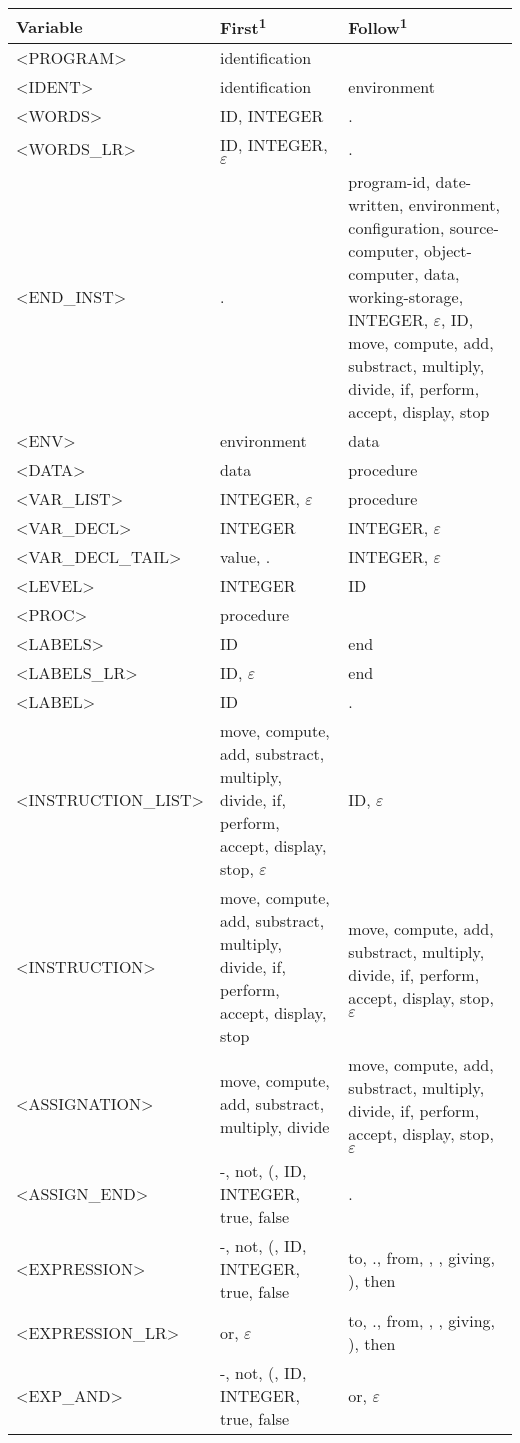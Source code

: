 \documentclass[a4paper,11pt]{article}
\begin{document}
\begin{longtable}{l>{\raggedright}p{6cm}p{6cm}}
	Variable & First\textsuperscript{1} & Follow\textsuperscript{1} \\ \hline
	<PROGRAM> & identification & \\
	<IDENT> & identification & environment\\
	<WORDS> & ID, INTEGER & .\\
	<WORDS\_LR> & ID, INTEGER, $\varepsilon$ & .\\
	<END\_INST> & . & program-id, date-written, environment, configuration, source-computer, object-computer, data, working-storage, INTEGER, $\varepsilon$, ID, move, compute, add, substract, multiply, divide, if, perform, accept, display, stop\\
	<ENV> & environment & data\\
	<DATA> & data & procedure\\
	<VAR\_LIST> & INTEGER, $\varepsilon$ & procedure \\
	<VAR\_DECL> & INTEGER & INTEGER, $\varepsilon$ \\
	<VAR\_DECL\_TAIL> & value, . & INTEGER, $\varepsilon$ \\
	<LEVEL> & INTEGER & ID\\
	<PROC> & procedure & \\
	<LABELS> & ID & end\\
	<LABELS\_LR> & ID, $\varepsilon$ & end\\
	<LABEL> & ID & .\\
	<INSTRUCTION\_LIST> & move, compute, add, substract, multiply, divide, if, perform, accept, display, stop, $\varepsilon$ & ID, $\varepsilon$\\
	<INSTRUCTION> & move, compute, add, substract, multiply, divide, if, perform, accept, display, stop &  move, compute, add, substract, multiply, divide, if, perform, accept, display, stop, $\varepsilon$ \\
	<ASSIGNATION> & move, compute, add, substract, multiply, divide & move, compute, add, substract, multiply, divide, if, perform, accept, display, stop, $\varepsilon$ \\
	<ASSIGN\_END> & -, not, (, ID, INTEGER, true, false & .\\
	<EXPRESSION> & -, not, (, ID, INTEGER, true, false & to, ., from, , , giving, ), then\\
	<EXPRESSION\_LR> & or, $\varepsilon$ & to, ., from, , , giving, ), then\\
	<EXP\_AND> & -, not, (, ID, INTEGER, true, false & or, $\varepsilon$ \\

\end{longtable}
\end{document}
